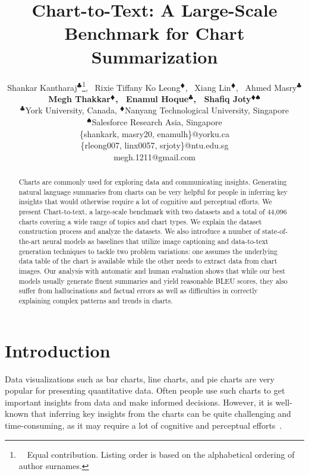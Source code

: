 \documentclass[11pt]{article}
\title{Chart-to-Text: A Large-Scale Benchmark for Chart Summarization}
\author{
Shankar Kantharaj$^{\clubsuit}$\thanks{\ \ Equal contribution. Listing order is based on the alphabetical ordering of author surnames.}, \  Rixie Tiffany Ko Leong$^{\vardiamondsuit}$\footnotemark[1], \ Xiang Lin$^\vardiamondsuit$\footnotemark[1], \ Ahmed Masry$^{\clubsuit}$\footnotemark[1]\\ \textbf{Megh Thakkar$^{\vardiamondsuit}$\footnotemark[1], \ Enamul Hoque$^{\clubsuit}$,  \ Shafiq Joty$^{\vardiamondsuit\spadesuit}$}\\
$^\clubsuit$York University, Canada, 
$^\vardiamondsuit$Nanyang Technological University, Singapore\\
$^\spadesuit$Salesforce Research Asia, Singapore\\
\{shankark, masry20, enamulh\}@yorku.ca\\
\{rleong007, linx0057, srjoty\}@ntu.edu.sg \\
megh.1211@gmail.com \\
}
\begin{document}
\maketitle




\begin{abstract}
Charts are commonly used for exploring data and communicating insights. Generating natural language summaries from charts can be very helpful for people in inferring key insights that would otherwise require a lot of cognitive and perceptual efforts. 
We present Chart-to-text, a large-scale benchmark with two datasets and a total of 44,096 charts covering a wide range of topics and chart types. We explain the dataset construction process and analyze the datasets. We also introduce a number of state-of-the-art neural models as baselines that utilize image captioning and data-to-text generation techniques to tackle two problem variations: one assumes the underlying data table of the chart is available while the other needs to extract data from chart images. Our analysis with automatic and human evaluation shows that while our best models usually generate fluent summaries and yield reasonable BLEU scores, they also suffer from  hallucinations and factual errors as well as difficulties in correctly explaining complex patterns and trends in charts.

\end{abstract}

\section{Introduction} \label{sec:intro}

Data visualizations such as bar charts, line charts, and pie charts are very popular for presenting quantitative data. Often people use such charts to get important insights from data and make informed decisions. However, it is well-known that inferring key insights from the charts can be quite challenging and time-consuming, as it may require a lot of cognitive and perceptual efforts~\cite{perez, whitaker}. 
\end{document}
